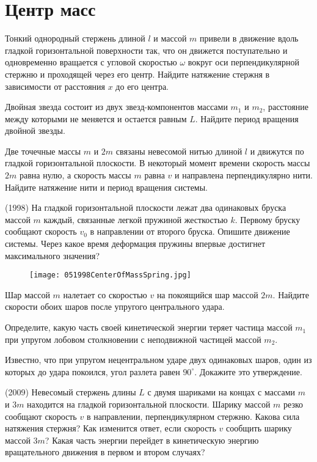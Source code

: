 \section{Центр масс}

\AddProb Тонкий однородный стержень длиной $l$ и массой $m$ привели в движение вдоль гладкой горизонтальной поверхности так, 
что он движется поступательно и одновременно вращается с угловой скоростью $\omega$ вокруг оси перпендикулярной стержню и проходящей через его центр. 
Найдите натяжение стержня в зависимости от расстояния $x$ до его центра.

\AddProb Двойная звезда состоит из двух звезд-компонентов массами $m_1$ и $m_2$, 
расстояние между которыми не меняется и остается равным $L$. Найдите период вращения двойной звезды.

\AddProb Две точечные массы $m$ и $2m$ связаны невесомой нитью длиной $l$ и движутся по гладкой горизонтальной плоскости. 
В некоторый момент времени скорость массы $2m$ равна нулю, а скорость массы $m$ равна $v$ и направлена перпендикулярно нити. 
Найдите натяжение нити и период вращения системы.

\AddProb (1998) На гладкой горизонтальной плоскости лежат два одинаковых бруска массой $m$ каждый, 
связанные легкой пружиной жесткостью $k$. Первому бруску сообщают скорость $v_0$ в направлении от второго бруска. 
Опишите движение системы. Через какое время деформация пружины впервые достигнет максимального значения? 

\begin{figure}[!h]
\centering
\texttt{[image: 051998CenterOfMassSpring.jpg]}
\end{figure}

\AddProb Шар массой $m$ налетает со скоростью $v$ на покоящийся шар массой $2m$. 
Найдите скорости обоих шаров после упругого центрального удара. 

\AddProb Определите, какую часть своей кинетической энергии теряет частица массой $m_1$ при упругом лобовом столкновении 
с неподвижной частицей массой $m_2$. 

\AddProb Известно, что при упругом нецентральном ударе двух одинаковых шаров, один из которых до удара покоился, 
угол разлета равен $90^{\circ}$. Докажите это утверждение.

\AddProb (2009) Невесомый стержень длины $L$ с двумя шариками на концах с массами $m$ и $3m$ находится на гладкой горизонтальной плоскости. 
Шарику массой $m$ резко сообщают скорость $v$ в направлении, перпендикулярном стержню. Какова сила натяжения стержня? 
Как изменится ответ, если скорость $v$ сообщить шарику массой $3m$? Какая часть энергии перейдет в кинетическую энергию вращательного движения в первом и втором случаях?

